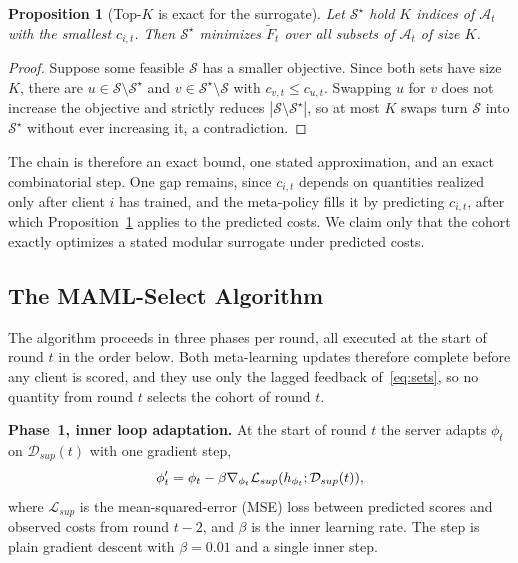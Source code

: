 \documentclass[journal]{IEEEtran}
\newtheorem{proposition}{Proposition}
\theoremstyle{remark}
\newcommand{\revision}[1]{#1}
\newcommand{\revtwo}[1]{#1}
\begin{document}
\begin{proposition}[\revtwo{Top-$K$ is exact for the surrogate}]\label{prop:topk}
\revtwo{Let $\mathcal{S}^\star$ hold $K$ indices of $\mathcal{A}_t$ with the smallest $c_{i,t}$. Then $\mathcal{S}^\star$ minimizes $\widetilde{F}_t$ over all subsets of $\mathcal{A}_t$ of size $K$.}
\end{proposition}
\begin{proof}
\revtwo{Suppose some feasible $\mathcal{S}$ has a smaller objective. Since both sets have size $K$, there are $u\in\mathcal{S}\setminus\mathcal{S}^\star$ and $v\in\mathcal{S}^\star\setminus\mathcal{S}$ with $c_{v,t}\le c_{u,t}$. Swapping $u$ for $v$ does not increase the objective and strictly reduces $|\mathcal{S}\setminus\mathcal{S}^\star|$, so at most $K$ swaps turn $\mathcal{S}$ into $\mathcal{S}^\star$ without ever increasing it, a contradiction.}
\end{proof}

\revtwo{The chain is therefore an exact bound, one stated approximation, and an exact combinatorial step. One gap remains, since $c_{i,t}$ depends on quantities realized only after client $i$ has trained, and the meta-policy fills it by predicting $c_{i,t}$, after which Proposition~\ref{prop:topk} applies to the predicted costs. We claim only that the cohort exactly optimizes a stated modular surrogate under predicted costs.}

\subsection{The MAML-Select Algorithm}\label{sec:method_selection}
The algorithm proceeds in three phases per round\revtwo{, all executed at the start of round $t$ in the order below. Both meta-learning updates therefore complete before any client is scored, and they use only the lagged feedback of~\eqref{eq:sets}, so no quantity from round $t$ selects the cohort of round $t$}.

\textbf{Phase~1, inner loop adaptation.}
\revision{At the start of round $t$ the server adapts $\phi_t$ on $\mathcal{D}_{sup}(t)$ with one gradient step,}
\begin{equation}
	\color{black}
		\phi'_t = \phi_t - \beta \nabla_{\phi_t} \mathcal{L}_{sup}(h_{\phi_t};\mathcal{D}_{sup}(t)),
		\label{eq:inner_loop}
\end{equation}
where $\mathcal{L}_{sup}$ is the mean-squared-error (MSE) loss between predicted scores and observed costs \revtwo{from round $t-2$}, and $\beta$ is the inner learning rate\revtwo{. The step is plain gradient descent with $\beta=0.01$ and a single inner step}.
\end{document}
